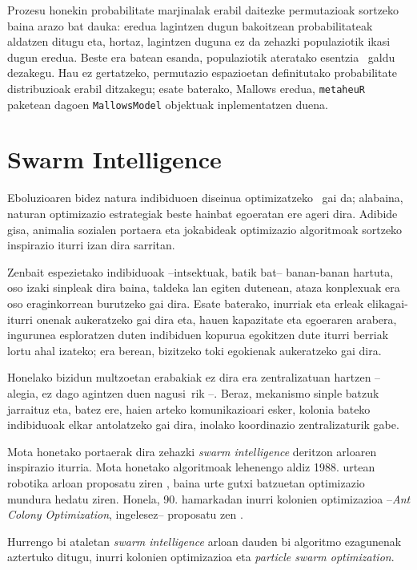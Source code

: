 \documentclass[eu]{ifirak}\usepackage[]{graphicx}\usepackage[]{color}
\newcommand{\zkk}{\guillemotleft}
\newcommand{\skk}{\guillemotright}
\newcommand{\code}[1]{\texttt{#1}}
\newcommand{\eng}[1]{\textit{#1}}
\newcommand{\hgl}[1]{\zkk #1\skk\ }
\begin{document}
Prozesu honekin probabilitate marjinalak erabil daitezke permutazioak sortzeko baina arazo bat dauka: eredua lagintzen dugun bakoitzean probabilitateak aldatzen ditugu eta, hortaz, lagintzen duguna ez da zehazki populaziotik ikasi dugun eredua. Beste era batean esanda, populaziotik ateratako \hgl{esentzia} galdu dezakegu. Hau ez gertatzeko, permutazio espazioetan definitutako probabilitate distribuzioak erabil ditzakegu; esate baterako, Mallows eredua, \code{metaheuR} paketean dagoen \code{MallowsModel} objektuak inplementatzen duena.


\section{Swarm Intelligence}\label{sec:swarm}

Eboluzioaren bidez natura indibiduoen diseinua \hgl{optimizatzeko} gai da; alabaina, naturan optimizazio estrategiak beste hainbat egoeratan ere ageri dira. Adibide gisa, animalia sozialen portaera eta jokabideak optimizazio algoritmoak sortzeko inspirazio iturri izan dira sarritan. 

Zenbait espezietako indibiduoak --intsektuak, batik bat-- banan-banan hartuta, oso izaki sinpleak dira baina, taldeka lan egiten dutenean, ataza konplexuak era oso eraginkorrean burutzeko gai dira. Esate baterako, inurriak eta erleak elikagai-iturri onenak aukeratzeko gai dira eta, hauen kapazitate eta egoeraren arabera, ingurunea esploratzen duten indibiduen kopurua egokitzen dute iturri berriak lortu ahal izateko; era berean, bizitzeko toki egokienak aukeratzeko gai dira.

Honelako bizidun multzoetan erabakiak ez dira era zentralizatuan hartzen --alegia, ez dago agintzen duen \hgl{nagusi}\negthickspace{}rik --. Beraz, mekanismo sinple batzuk jarraituz eta, batez ere, haien arteko komunikazioari esker, kolonia bateko indibiduoak elkar antolatzeko gai dira, inolako koordinazio zentralizaturik gabe.

Mota honetako portaerak dira zehazki \eng{swarm intelligence} deritzon arloaren inspirazio iturria. Mota honetako algoritmoak lehenengo aldiz 1988. urtean robotika arloan proposatu ziren \cite{beni1988}, baina urte gutxi batzuetan optimizazio mundura hedatu ziren. Honela, 90. hamarkadan inurri kolonien optimizazioa --\eng{Ant Colony Optimization}, ingelesez-- proposatu zen \cite{dorigo1992, dorigo1996}.

Hurrengo bi ataletan \eng{swarm intelligence} arloan dauden bi algoritmo ezagunenak aztertuko ditugu, inurri kolonien optimizazioa eta \eng{particle swarm optimization}.
\end{document}
